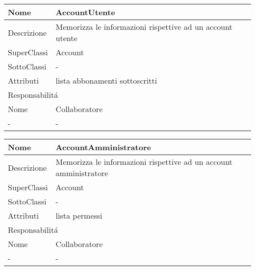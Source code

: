 \begin{center} %
    \begin{longtable}{ |p{3cm}|p{3cm}|p{3cm}|p{3cm}| }
        \hline
        Nome & \multicolumn{3}{|p{9cm}|}{AccountUtente} \\\hline
        Descrizione & \multicolumn{3}{|p{9cm}|}{Memorizza le informazioni rispettive ad un account utente} \\\hline
        SuperClassi & \multicolumn{3}{|p{9cm}|}{Account} \\\hline
        SottoClassi & \multicolumn{3}{|p{9cm}|}{-} \\\hline
        Attributi & \multicolumn{3}{|p{9cm}|}{lista abbonamenti sottoscritti} \\\hline
        \multicolumn{4}{|p{12cm}|}{Responsabilit\'a} \\\hline %
        \multicolumn{2}{|p{6cm}|}{Nome} & \multicolumn{2}{|p{6cm}|}{Collaboratore} \\\hline %
        \multicolumn{2}{|p{6cm}|}{-} & \multicolumn{2}{|p{6cm}|}{-} \\\hline
    \end{longtable}
\end{center}

\begin{center} %
    \begin{longtable}{ |p{3cm}|p{3cm}|p{3cm}|p{3cm}| }
        \hline
        Nome & \multicolumn{3}{|p{9cm}|}{AccountAmministratore} \\\hline
        Descrizione & \multicolumn{3}{|p{9cm}|}{Memorizza le informazioni rispettive ad un account amministratore} \\\hline
        SuperClassi & \multicolumn{3}{|p{9cm}|}{Account} \\\hline
        SottoClassi & \multicolumn{3}{|p{9cm}|}{-} \\\hline
        Attributi & \multicolumn{3}{|p{9cm}|}{lista permessi} \\\hline
        \multicolumn{4}{|p{12cm}|}{Responsabilit\'a} \\\hline %
        \multicolumn{2}{|p{6cm}|}{Nome} & \multicolumn{2}{|p{6cm}|}{Collaboratore} \\\hline %
        \multicolumn{2}{|p{6cm}|}{-} & \multicolumn{2}{|p{6cm}|}{-} \\\hline
    \end{longtable}
\end{center}

